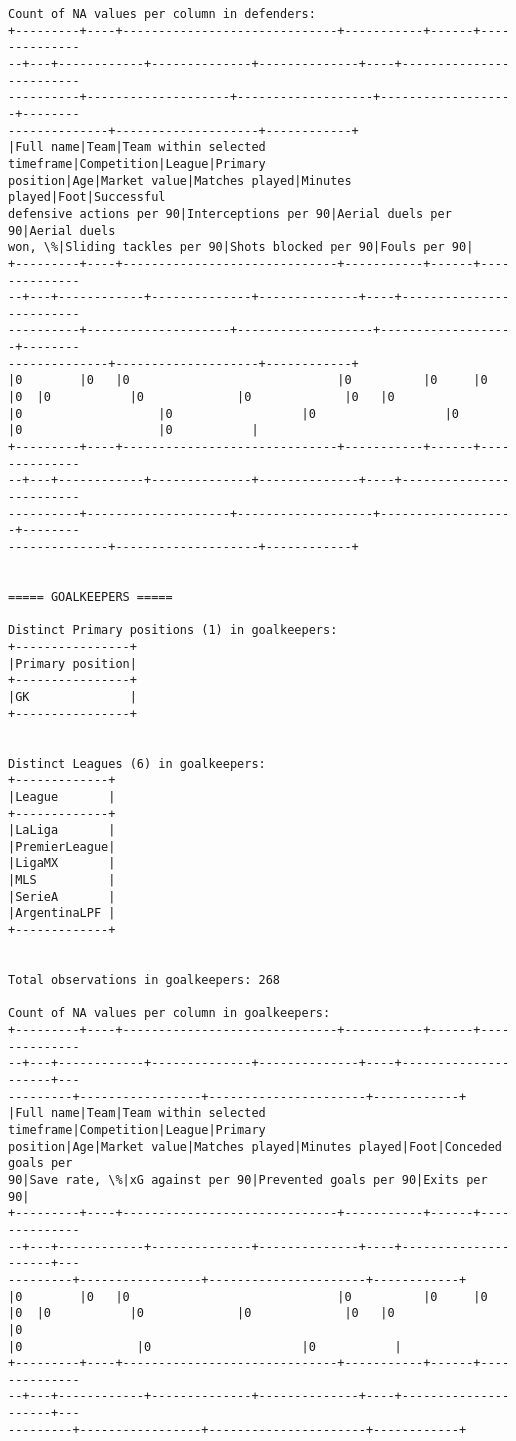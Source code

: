\documentclass[11pt]{article}
\begin{document}
\begin{Verbatim}[commandchars=\\\{\}]
Count of NA values per column in defenders:
+---------+----+------------------------------+-----------+------+--------------
--+---+------------+--------------+--------------+----+-------------------------
----------+--------------------+-------------------+-------------------+--------
--------------+--------------------+------------+
|Full name|Team|Team within selected timeframe|Competition|League|Primary
position|Age|Market value|Matches played|Minutes played|Foot|Successful
defensive actions per 90|Interceptions per 90|Aerial duels per 90|Aerial duels
won, \%|Sliding tackles per 90|Shots blocked per 90|Fouls per 90|
+---------+----+------------------------------+-----------+------+--------------
--+---+------------+--------------+--------------+----+-------------------------
----------+--------------------+-------------------+-------------------+--------
--------------+--------------------+------------+
|0        |0   |0                             |0          |0     |0
|0  |0           |0             |0             |0   |0
|0                   |0                  |0                  |0
|0                   |0           |
+---------+----+------------------------------+-----------+------+--------------
--+---+------------+--------------+--------------+----+-------------------------
----------+--------------------+-------------------+-------------------+--------
--------------+--------------------+------------+


===== GOALKEEPERS =====

Distinct Primary positions (1) in goalkeepers:
+----------------+
|Primary position|
+----------------+
|GK              |
+----------------+


Distinct Leagues (6) in goalkeepers:
+-------------+
|League       |
+-------------+
|LaLiga       |
|PremierLeague|
|LigaMX       |
|MLS          |
|SerieA       |
|ArgentinaLPF |
+-------------+


Total observations in goalkeepers: 268

Count of NA values per column in goalkeepers:
+---------+----+------------------------------+-----------+------+--------------
--+---+------------+--------------+--------------+----+---------------------+---
---------+-----------------+----------------------+------------+
|Full name|Team|Team within selected timeframe|Competition|League|Primary
position|Age|Market value|Matches played|Minutes played|Foot|Conceded goals per
90|Save rate, \%|xG against per 90|Prevented goals per 90|Exits per 90|
+---------+----+------------------------------+-----------+------+--------------
--+---+------------+--------------+--------------+----+---------------------+---
---------+-----------------+----------------------+------------+
|0        |0   |0                             |0          |0     |0
|0  |0           |0             |0             |0   |0                    |0
|0                |0                     |0           |
+---------+----+------------------------------+-----------+------+--------------
--+---+------------+--------------+--------------+----+---------------------+---
---------+-----------------+----------------------+------------+

    \end{Verbatim}
\end{document}
